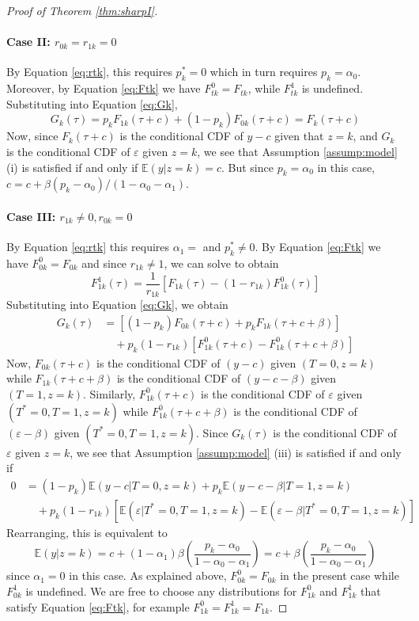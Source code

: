 \begin{proof}[Proof of Theorem \ref{thm:sharpI}]
\paragraph{Case II: $r_{0k} = r_{1k} = 0$}
By Equation \ref{eq:rtk}, this requires $p_k^* = 0$ which in turn requires $p_k = \alpha_0$.
Moreover, by Equation \ref{eq:Ftk} we have $F^0_{tk} = F_{tk}$, while $F^1_{tk}$ is undefined.
Substituting into Equation \ref{eq:Gk},
\[
  G_k(\tau) = p_k F_{1k}(\tau + c) + (1 - p_k) F_{0k}(\tau + c) = F_k(\tau + c)
\]
Now, since $F_k(\tau + c)$ is the conditional CDF of $y-c$ given that $z=k$, and $G_k$ is the conditional CDF of $\varepsilon$ given $z=k$,
we see that Assumption \ref{assump:model} (i) is satisfied if and only if $\mathbb{E}(y|z=k) = c$.
But since $p_k = \alpha_0$ in this case, $c = c + \beta (p_k - \alpha_0)/(1 - \alpha_0 - \alpha_1)$.

\paragraph{Case III: $r_{1k}\neq 0, r_{0k} = 0$}
By Equation \ref{eq:rtk} this requires $\alpha_1 = $ and $p_k^* \neq 0$.
By Equation \ref{eq:Ftk} we have $F^0_{0k} = F_{0k}$ and since $r_{1k} \neq 1$, we can solve to obtain
\[
  F^1_{1k}(\tau) = \frac{1}{r_{1k}}\left[F_{1k}(\tau) - (1 - r_{1k})F^0_{1k}(\tau)\right]
\]
Substituting into Equation \ref{eq:Gk}, we obtain
\begin{align*}
  G_k(\tau) &= \left[ (1 - p_k)F_{0k}(\tau + c) + p_k F_{1k}(\tau + c + \beta) \right] \\ 
  &\quad + p_k(1 - r_{1k})\left[ F^0_{1k}(\tau + c) - F^0_{1k}(\tau + c + \beta) \right]
\end{align*}
Now, $F_{0k}(\tau + c)$ is the conditional CDF of $(y-c)$ given $(T=0,z=k)$ while $F_{1k}(\tau + c + \beta)$ is the conditional CDF of $(y-c-\beta)$ given $(T=1,z=k)$.
Similarly, $F^0_{1k}(\tau + c)$ is the conditional CDF of $\varepsilon$ given $(T^*=0,T = 1, z=k)$ while $F^0_{1k}(\tau + c + \beta)$ is the conditional CDF of $(\varepsilon - \beta)$ given $(T^*=0, T=1, z=k)$.
Since $G_k(\tau)$ is the conditional CDF of $\varepsilon$ given $z=k$, we see that Assumption \ref{assump:model} (iii) is satisfied if and only if
\begin{align*}
  0 &= (1 - p_k) \mathbb{E}(y-c|T=0,z=k) + p_k \mathbb{E}(y - c - \beta|T=1,z=k)\\
  &\quad + p_k(1 - r_{1k})\left[ \mathbb{E}(\varepsilon|T^*=0,T=1,z=k) - \mathbb{E}(\varepsilon - \beta|T^*=0,T=1,z=k) \right]
\end{align*}
Rearranging, this is equivalent to 
\[
  \mathbb{E}(y|z=k) = c + (1 - \alpha_1) \beta\left( \frac{p_k - \alpha_0}{1 - \alpha_0 - \alpha_1} \right) = c + \beta\left( \frac{p_k - \alpha_0}{1 - \alpha_0 - \alpha_1} \right)
\]
since $\alpha_1 = 0$ in this case.
As explained above, $F^0_{0k} = F_{0k}$ in the present case while $F^1_{0k}$ is undefined. 
We are free to choose any distributions for $F^{0}_{1k}$ and $F^{1}_{1k}$ that satisfy Equation \ref{eq:Ftk}, for example $F^{0}_{1k} = F^{1}_{1k} = F_{1k}$.


\end{proof}
